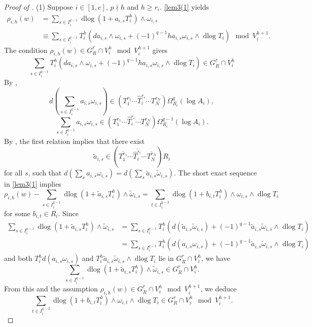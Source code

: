 \documentclass[11pt]{amsart}
\newcommand{\eq}[2]{\begin{equation}\label{#1}#2 \end{equation}}
\newcommand{\dlog}{\operatorname{dlog}}
\renewcommand{\hat}{\widehat}
\newcommand{\ul}{\underline}
\renewcommand{\tilde}{\widetilde}
\theoremstyle{plain}
\theoremstyle{definition}
\numberwithin{equation}{prop}
\begin{document}
\begin{proof}[Proof of ]
(1)
Suppose $i\in [1,e]$, $p\nmid h$ and $h\ge r_i$.   
\eqref{lem3(1} yields
\begin{align*} \rho_{i,h}(w)
&=\sum_{s\in I_i^{q-1}} \dlog(1+a_{i,s}T_i^{h})\wedge\omega_{i,s}
\\
&\equiv \sum_{s\in I_i^{q-1}}T_i^{h}
\left(
da_{i,s}\wedge \omega_{i,s}
    + (-1)^{q-1}  h a_{i,s} \omega_{i,s}\wedge \dlog T_i
\right)
\mod V_i^{h+1}.
\end{align*}
The condition $\rho_{i,h}(w)\in G_R^{\ul r} \cap V_i^{h}\mod V_i^{h+1}$ gives
$$\sum_{s\in I_i^{q-1}}T_i^{h}
\left(
da_{i,s}\wedge \omega_{i,s}
    + (-1)^{q-1}  h a_{i,s} \omega_{i,s}\wedge \dlog T_i
\right)\in G_R^{\ul r} \cap V_i^{h}$$
By , 
\eq{lem4(1)-1}{
d(\sum_{s\in I_i^{q-1}} a_{i,s}\omega_{i,s})\in 
(T_1^{r_1}\cdots\hat T_i^{r_i}\cdots  T_N^{r_N})\Omega^q_{R_i}(\log A_i),
}
\eq{lem4(1)-2}{
\sum_{s\in I_i^{q-1}} a_{i,s}\omega_{i,s}\in 
(T_1^{r_1}\cdots\hat T_i^{r_i}\cdots  T_N^{r_N})\Omega^{q-1}_{R_i}(\log A_i).
}
By , the first relation implies that
there exist
$$\tilde a_{i,s}\in (T_1^{\tilde r_1}\cdots \hat T_i^{\tilde r_i}\cdots T_N^{\tilde r_N})R_i$$
for all $s$, such that
$d(\sum_{s} a_{i,s}\omega_{i,s})=d(\sum_{s} \tilde a_{i,s}\tilde \omega_{i,s})$.
The short exact sequence in \eqref{lem3(1} implies 
$$\rho_{i,h}(w)-
\sum_{s\in I_i^{q-1}} \dlog(1+\tilde a_{i,s}T_i^{h})\wedge\tilde\omega_{i,s}
=\sum_{t\in I_i^{q-2}} \dlog(1+b_{i,t}T_i^{h})\wedge\omega_{i,s}\wedge \dlog T_i
$$
for some $b_{i,t}\in R_i$.
Since 
\begin{align*} 
\sum_{s\in I_i^{q-1}} \dlog(1+\tilde a_{i,s}T_i^{h})\wedge\tilde\omega_{i,s}
&=\sum_{s\in I_i^{q-1}} T_i^h
\left(d(\tilde a_{i,s}\tilde \omega_{i,s})
+(-1)^{q-1}\tilde a_{i,s}\tilde\omega_{i,s}\wedge \dlog T_i
\right)
\\
&=\sum_{s\in I_i^{q-1}} T_i^h
\left(d(a_{i,s} \omega_{i,s})
+(-1)^{q-1}\tilde a_{i,s}\tilde\omega_{i,s}\wedge\dlog T_i
\right)
\end{align*} 
and both $T_i^hd(a_{i,s} \omega_{i,s})$ and $T_i^h\tilde a_{i,s}\tilde\omega_{i,s}\wedge\dlog T_i$
lie in $G_R^{\ul r}\cap V_i^{h}$, we have
$$\sum_{s\in I_i^{q-1}} \dlog(1+\tilde a_{i,s}T_i^{h})\wedge\tilde\omega_{i,s}
\in G_R^{\ul r}\cap V_i^{h}.$$
From this and the assumption
$\rho_{i,h}(w)\in G_R^{\ul r}\cap V_i^{h} \mod V_i^{h+1}$, we deduce
$$\sum_{t\in I_i^{q-2}} \dlog(1+b_{i,t}T_i^{h})\wedge\omega_{i,t}\wedge \dlog T_i
\in G_R^{\ul r} \cap V_i^{h}
\mod V_i^{h+1}.$$

\end{proof}
\end{document}
